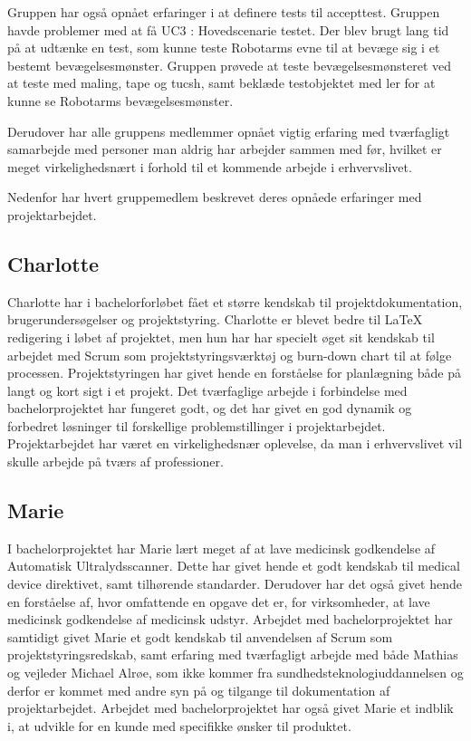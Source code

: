 Gruppen har også opnået erfaringer i at definere tests til accepttest. Gruppen havde problemer med at få UC3 : Hovedscenarie testet. Der blev brugt lang tid på at udtænke en test, som kunne teste Robotarms evne til at bevæge sig i et bestemt bevægelsesmønster. Gruppen prøvede at teste bevægelsesmønsteret ved at teste med maling, tape og tucsh, samt beklæde testobjektet med ler for at kunne se Robotarms bevægelsesmønster. 

Derudover har alle gruppens medlemmer opnået vigtig erfaring med tværfagligt samarbejde med personer man aldrig har arbejder sammen med før, hvilket er meget virkelighedsnært i forhold til et kommende arbejde i erhvervslivet.

Nedenfor har hvert gruppemedlem beskrevet deres opnåede erfaringer med projektarbejdet. 

\subsection{Charlotte}
Charlotte har i bachelorforløbet fået et større kendskab til projektdokumentation, brugerundersøgelser og projektstyring. Charlotte er blevet bedre til LaTeX redigering i løbet af projektet, men hun har har specielt øget sit kendskab til arbejdet med Scrum som projektstyringsværktøj og burn-down chart til at følge processen. Projektstyringen har givet hende en forståelse for planlægning både på langt og kort sigt i et projekt. Det tværfaglige arbejde i forbindelse med bachelorprojektet har fungeret godt, og det har givet en god dynamik og forbedret løsninger til forskellige problemstillinger i projektarbejdet. Projektarbejdet har været en virkelighedsnær oplevelse, da man i erhvervslivet vil skulle arbejde på tværs af professioner. 

\subsection{Marie}
I bachelorprojektet har Marie lært meget af at lave medicinsk godkendelse af Automatisk Ultralydsscanner. Dette har givet hende et godt kendskab til medical device direktivet, samt tilhørende standarder. Derudover har det også givet hende en forståelse af, hvor omfattende en opgave det er, for virksomheder, at lave medicinsk godkendelse af medicinsk udstyr. Arbejdet med bachelorprojektet har samtidigt givet Marie et godt kendskab til anvendelsen af Scrum som projektstyringsredskab, samt erfaring med tværfagligt arbejde med både Mathias og vejleder Michael Alrøe, som ikke kommer fra sundhedsteknologiuddannelsen og derfor er kommet med andre syn på og tilgange til dokumentation af projektarbejdet. Arbejdet med bachelorprojektet har også givet Marie et indblik i, at udvikle for en kunde med specifikke ønsker til produktet. 

